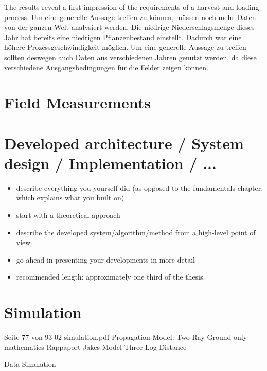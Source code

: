 \documentclass[]{nsm-thesis}
\begin{document}
The results reveal a first impression of the requirements of a harvest and loading process. Um eine generelle Aussage treffen zu können, müssen noch mehr Daten von der ganzen Welt analysiert werden. Die niedrige Niederschlagsmenge dieses Jahr hat bereits eine niedrigen Pflanzenbestand einstellt. Dadurch war eine höhere Prozessgeschwindigkeit möglich. Um eine generelle Aussage zu treffen sollten deswegen auch Daten aus verschiedenen Jahren genutzt werden, da diese verschiedene Ausgangsbedingungen für die Felder zeigen können. 





\chapter{Field Measurements}


\chapter{Developed architecture / System design / Implementation / ...}


\begin{itemize}
\item describe everything you yourself did (as opposed to the fundamentals chapter, which explains what you built on)
\item start with a theoretical approach
\item describe the developed system/algorithm/method from a high-level point of view
\item go ahead in presenting your developments in more detail
\item recommended length: approximately one third of the thesis.
\end{itemize}

\chapter{Simulation}
Seite 77 von 93 02 simulation.pdf
Propagation Model:
 Two Ray Ground only mathematics Rappaport
 Jakes Model
 Three Log Distance
 
 
 Data Simulation
 
 
 
\end{document}
